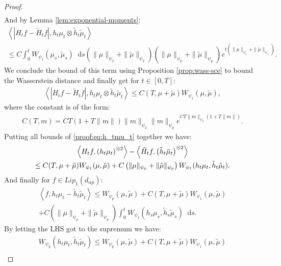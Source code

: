\documentclass[11pt,a4paper]{article}
\newcommand{\brac}[1]{\left\langle#1\right\rangle}
\newcommand{\dd}{\mathop{}\!\mathrm{d}}
\begin{document}
\begin{proof}
\begin{align*}
    \end{align*}
    And by Lemma \ref{lem:exponential-moments}:
    \begin{multline*}
        \brac{\left|H_tf - \tilde{H}_tf\right|,h_t\mu_t \otimes \tilde{h}_t \tilde{\mu}_t} \\
         \leq C\int_0^t W_{\psi_1}(\mu_s,\tilde{\mu}_s)\dd s \left(\|\mu\|_{\psi_2} + \|\tilde{\mu}\|_{\psi_2} \right)\left(\|\mu\|_{\psi_{p}}+ \|\tilde{\mu}\|_{\psi_{p}} \right) e^{t\left(\|\mu\|_{\psi_1} + \|\tilde{\mu}\|_{\psi_1}\right)}.
    \end{multline*}
    We conclude the bound of this term using Proposition \ref{prop:wass-sce} to bound the Wasserstein distance and finally get for $t \in [0,T]$:
    \begin{align*}
        \brac{\left|H_tf - \tilde{H}_tf\right|,h_t\mu_t \otimes \tilde{h}_t \tilde{\mu}_t}  \leq C(T,\mu + \tilde{\mu})  W_{\psi_1}(\mu,\tilde{\mu}),
    \end{align*}
    where the constant is of the form:
    \begin{align*}
        C(T,m) = CT\left( 1 + T\|m\|\right)\|m\|_{\psi_2} \|m\|_{\psi_{p}}e^{CT\|m\|_{\psi_2}\left(1 + T\|m\|\right)}.
    \end{align*}
    Putting all bounds of \eqref{proof:eq:h_tmu_t} together we have:
    \begin{multline*}
        \brac{H_tf,\left(h_t\mu_t\vphantom{\tilde{\mu}}\right)^{\otimes 2}} - \brac{\tilde{H}_tf,\left(\tilde{h}_t\tilde{\mu}_t\right)^{\otimes 2}}\\
        \leq C(T,\mu + \tilde{\mu}) W_{\psi_1}(\mu,\tilde{\mu}) + C\left(\|\mu\|_{\psi_{p}}+ \|\tilde{\mu}\|_{\psi_{p}} \right)W_{\psi_1}(h_t\mu_t, \tilde{h}_t \tilde{\mu}_t) .
    \end{multline*}
    And finally for $f \in Lip_1(d_{\alpha p})$:
    \begin{multline*}
        \brac{f, h_t\mu_t - \tilde{h}_t\tilde{\mu}_t} \leq W_{\psi_p}(\mu,\tilde{\mu}) +  C(T,\mu + \tilde{\mu}) W_{\psi_1}(\mu,\tilde{\mu})\\
         + C\left(\|\mu\|_{\psi_{p}}+ \|\tilde{\mu}\|_{\psi_{p}} \right)\int_0^t W_{\psi_1}(h_s\mu_s, \tilde{h}_s \tilde{\mu}_s) \dd s.
    \end{multline*}
    By letting the LHS got to the supremum we have:
    \begin{multline*}
        W_{\psi_p} \left(h_t\mu_t ,\tilde{h}_t\tilde{\mu}_t\right) \leq W_{\psi_p}(\mu,\tilde{\mu}) +  C(T,\mu + \tilde{\mu}) W_{\psi_1}(\mu,\tilde{\mu})\\

\end{multline*}
\end{proof}
\end{document}
